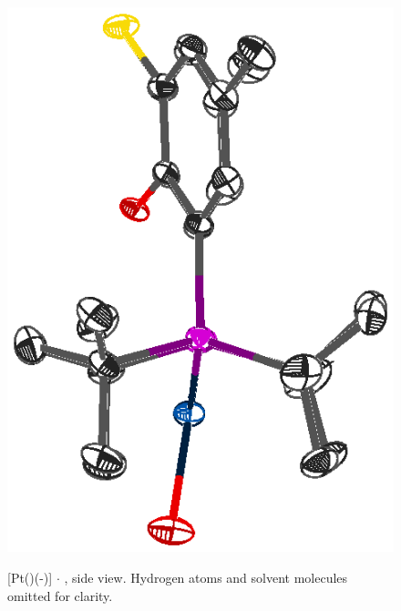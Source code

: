 \begin{figure}[ht]
\begin{center}
\vspace{0.5cm}
\includegraphics{../Figures/Crystalplatinumdioxygenside.eps}
\caption[X-ray crystal structure of \texorpdfstring{[Pt(\tButhixantphos)(-){]}} P $\cdot{}$  side view]{[Pt(\tButhixantphos)(-)] $\cdot{}$ , side view.  Hydrogen atoms and solvent molecules omitted for clarity.}
\vspace{0.2cm}
\label{crystal:dioxygenside}
\end{center}
\end{figure}
\vspace{0.2cm}

